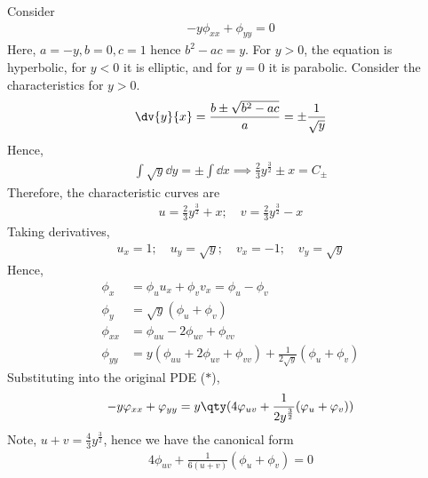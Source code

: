 \begin{example}
	Consider
	\begin{align*}
		-y \phi_{xx} + \phi_{yy} = 0 \tag{$\ast$}
	\end{align*}
	Here, $a = -y, b = 0, c = 1$ hence $b^2 - ac = y$.
	For $y > 0$, the equation is hyperbolic, for $y < 0$ it is elliptic, and for $y = 0$ it is parabolic.
	Consider the characteristics for $y > 0$.
	\begin{align*}
		\dv{y}{x} = \frac{b \pm \sqrt{b^2 - ac}}{a} = \pm \frac{1}{\sqrt{y}}
	\end{align*}
	Hence,
	\begin{align*}
		\int \sqrt{y} \dd{y} = \pm \int \dd{x} \implies \frac{2}{3} y^{\frac{3}{2}} \pm x = C_\pm
	\end{align*}
	Therefore, the characteristic curves are
	\begin{align*}
		u = \frac{2}{3} y^{\frac{3}{2}} + x;\quad v = \frac{2}{3} y^{\frac{3}{2}} - x
	\end{align*}
	Taking derivatives,
	\begin{align*}
		u_x = 1;\quad u_y = \sqrt{y};\quad v_x = -1;\quad v_y = \sqrt{y}
	\end{align*}
	Hence,
	\begin{align*}
		\phi_x &= \phi_u u_x + \phi_v v_x = \phi_u - \phi_v \\
		\phi_y &= \sqrt{y} (\phi_u + \phi_v) \\
		\phi_{xx} &= \phi_{uu} - 2 \phi_{uv} + \phi_{vv} \\
		\phi_{yy} &= y (\phi_{uu} + 2 \phi_{uv} + \phi_{vv}) + \frac{1}{2\sqrt{y}}(\phi_u + \phi_v)
	\end{align*}
	Substituting into the original PDE ($\ast$),
	\begin{align*}
		-y \phi_{xx} + \phi_{yy} = y\qty(4 \phi_{uv} + \frac{1}{2y^{\frac{3}{2}}} (\phi_u + \phi_v) )
	\end{align*}
	Note, $u + v = \frac{4}{3} y^{\frac{3}{2}}$, hence we have the canonical form
	\begin{align*}
		4 \phi_{uv} + \frac{1}{6(u+v)} (\phi_u + \phi_v) = 0
	\end{align*}
\end{example}

